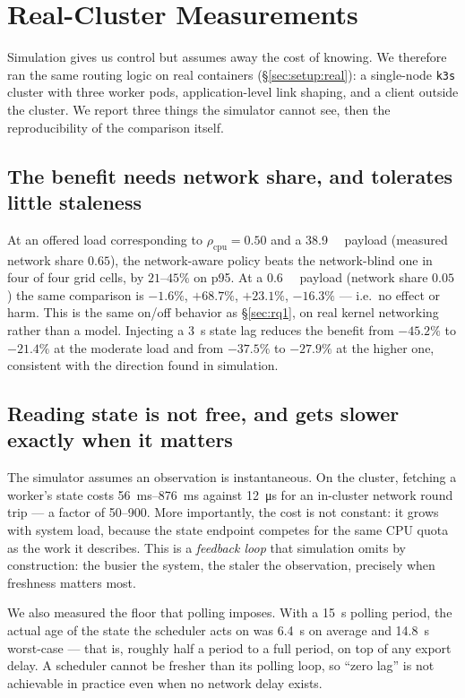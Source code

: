 \section{Real-Cluster Measurements}
\label{sec:real}

Simulation gives us control but assumes away the cost of knowing. We therefore ran the same
routing logic on real containers (\S\ref{sec:setup:real}): a single-node \texttt{k3s} cluster with
three worker pods, application-level link shaping, and a client outside the cluster. We report
three things the simulator cannot see, then the reproducibility of the comparison itself.

\subsection{The benefit needs network share, and tolerates little staleness}
At an offered load corresponding to $\rho_{\text{cpu}}=0.50$ and a \SI{38.9}{\mega\byte} payload
(measured network share $0.65$), the network-aware policy beats the network-blind one in four of
four grid cells, by $21$--$45\%$ on p95. At a \SI{0.6}{\mega\byte} payload (network share
$0.05$) the same comparison is $-1.6\%$, $+68.7\%$, $+23.1\%$, $-16.3\%$ --- i.e.~no effect or
harm. This is the same on/off behavior as \S\ref{sec:rq1}, on real kernel networking rather than
a model. Injecting a \SI{3}{\second} state lag reduces the benefit from $-45.2\%$ to $-21.4\%$ at
the moderate load and from $-37.5\%$ to $-27.9\%$ at the higher one, consistent with the
direction found in simulation.

\subsection{Reading state is not free, and gets slower exactly when it matters}
The simulator assumes an observation is instantaneous. On the cluster, fetching a worker's state
costs \SIrange{56}{876}{\milli\second} against \SI{12}{\micro\second} for an in-cluster network
round trip --- a factor of \numrange{50}{900}. More importantly, the cost is not constant: it
grows with system load, because the state endpoint competes for the same CPU quota as the work it
describes. This is a \emph{feedback loop} that simulation omits by construction: the busier the
system, the staler the observation, precisely when freshness matters most.

We also measured the floor that polling imposes. With a \SI{15}{\second} polling period, the
actual age of the state the scheduler acts on was \SI{6.4}{\second} on average and
\SI{14.8}{\second} worst-case --- that is, roughly half a period to a full period, on top of any
export delay. A scheduler cannot be fresher than its polling loop, so ``zero lag'' is not
achievable in practice even when no network delay exists.

